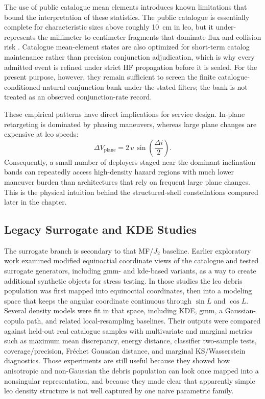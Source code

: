    The use of public catalogue mean elements introduces known limitations that bound the interpretation of these statistics. The public catalogue is essentially complete for characteristic sizes above roughly \SI{10}{\cm} in \gls{leo}, but it under-represents the millimeter-to-centimeter fragments that dominate flux and collision risk \cite{Krisko2014ORDEM,Johnson2001}. Catalogue mean-element states are also optimized for short-term catalog maintenance rather than precision conjunction adjudication, which is why every admitted event is refined under strict HF propagation before it is sealed. For the present purpose, however, they remain sufficient to screen the finite catalogue-conditioned natural conjunction bank under the stated filters; the bank is not treated as an observed conjunction-rate record.

    These empirical patterns have direct implications for service design. In-plane retargeting is dominated by phasing maneuvers, whereas large plane changes are expensive at \gls{leo} speeds:
    \begin{equation}
        \Delta V_{\text{plane}} = 2\,v\,\sin\!\left(\frac{\Delta i}{2}\right).
    \end{equation}
    Consequently, a small number of deployers staged near the dominant inclination bands can repeatedly access high-density hazard regions with much lower maneuver burden than architectures that rely on frequent large plane changes. This is the physical intuition behind the structured-shell constellations compared later in the chapter.

\subsection{Legacy Surrogate and KDE Studies}
    The surrogate branch is secondary to that MF/\(J_2\) baseline. Earlier exploratory work examined modified equinoctial coordinate views of the catalogue and tested surrogate generators, including \gls{gmm}- and \gls{kde}-based variants, as a way to create additional synthetic objects for stress testing. In those studies the \gls{leo} debris population was first mapped into equinoctial coordinates, then into a modeling space that keeps the angular coordinate continuous through \(\sin L\) and \(\cos L\). Several density models were fit in that space, including KDE, \gls{gmm}, a Gaussian-copula path, and related local-resampling baselines. Their outputs were compared against held-out real catalogue samples with multivariate and marginal metrics such as maximum mean discrepancy, energy distance, classifier two-sample tests, coverage/precision, Fr\'echet Gaussian distance, and marginal KS/Wasserstein diagnostics. Those experiments are still useful because they showed how anisotropic and non-Gaussian the debris population can look once mapped into a nonsingular representation, and because they made clear that apparently simple \gls{leo} density structure is not well captured by one naive parametric family.


